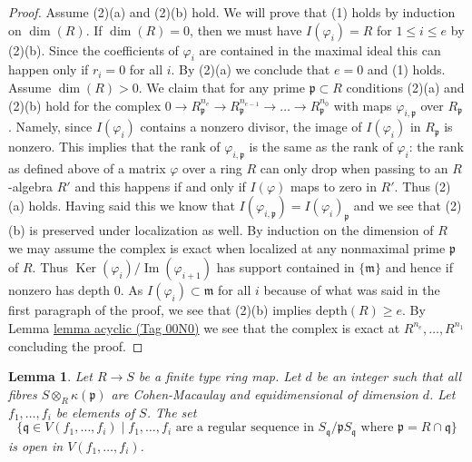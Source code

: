 \documentclass{amsart}
\theoremstyle{plain}
\newtheorem{lemma}[subsection]{Lemma}
\theoremstyle{definition}
\theoremstyle{remark}
\numberwithin{equation}{subsection}
\def\Ker{\mathop{\mathrm{Ker}}}
\def\Im{\mathop{\mathrm{Im}}}
\begin{document}
\begin{proof}
\medskip\noindent
Assume (2)(a) and (2)(b) hold. We will prove that (1) holds by
induction on $\dim(R)$. If $\dim(R) = 0$, then we must have
$I(\varphi_i) = R$ for $1 \leq i \leq e$ by (2)(b). Since the
coefficients of $\varphi_i$ are contained in the maximal ideal
this can happen only if $r_i = 0$ for all $i$. By (2)(a) we
conclude that $e = 0$ and (1) holds. Assume $\dim(R) > 0$.
We claim that for any prime $\mathfrak p \subset R$ conditions
(2)(a) and (2)(b) hold for the complex
$0 \to R_\mathfrak p^{n_e} \to R_\mathfrak p^{n_{e - 1}} \to \ldots \to
R_\mathfrak p^{n_0}$ with maps $\varphi_{i, \mathfrak p}$
over $R_\mathfrak p$. Namely, since $I(\varphi_i)$ contains a
nonzero divisor, the image of $I(\varphi_i)$ in $R_\mathfrak p$
is nonzero. This implies that the rank of $\varphi_{i, \mathfrak p}$
is the same as the rank of $\varphi_i$: the rank as defined above
of a matrix $\varphi$ over a ring $R$ can only drop when passing
to an $R$-algebra $R'$ and this happens if and only if $I(\varphi)$
maps to zero in $R'$. Thus (2)(a) holds. Having said this
we know that $I(\varphi_{i, \mathfrak p}) = I(\varphi_i)_\mathfrak p$
and we see that (2)(b) is preserved under localization as well.
By induction on the dimension of $R$ we may assume the complex
is exact when localized at any nonmaximal prime $\mathfrak p$ of $R$.
Thus $\Ker(\varphi_i)/\Im(\varphi_{i + 1})$ has support contained in
$\{\mathfrak m\}$ and hence if nonzero has depth $0$.
As $I(\varphi_i) \subset \mathfrak m$ for all $i$ because
of what was said in the first paragraph of the proof, we
see that (2)(b) implies $\text{depth}(R) \geq e$.
By Lemma \href{https://stacks.math.columbia.edu/tag/00N0}{lemma acyclic (Tag 00N0)} we see
that the complex is exact at $R^{n_e}, \ldots, R^{n_1}$
concluding the proof.
\end{proof}


\begin{lemma}
\label{lemma-open-regular-sequence}
Let $R \to S$ be a finite type ring map. Let $d$ be an integer such that all
fibres $S \otimes_R \kappa(\mathfrak p)$ are Cohen-Macaulay and equidimensional
of dimension $d$. Let $f_1, \ldots, f_i$ be elements of $S$. The set
$$
\{ \mathfrak q \in V(f_1, \ldots, f_i)
\mid f_1, \ldots, f_i
\text{ are a regular sequence in }
S_{\mathfrak q}/\mathfrak p S_{\mathfrak q}
\text{ where }\mathfrak p = R \cap \mathfrak q
\}
$$
is open in $V(f_1, \ldots, f_i)$.
\end{lemma}
\end{document}
